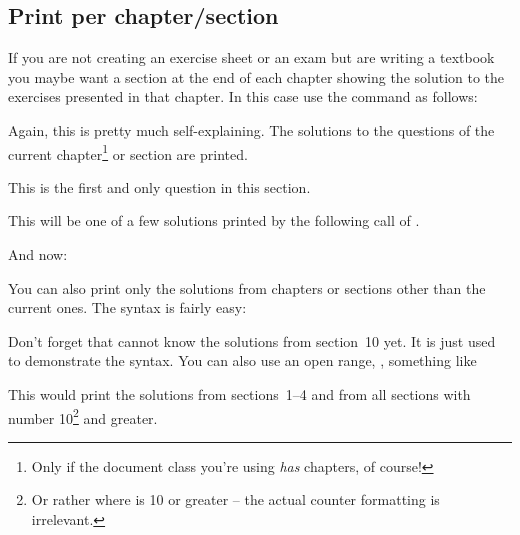 \documentclass[load-preamble+,scrartcl={DIV10}]{cnltx-doc}
\begin{document}
\subsection{Print per chapter/section}
If you are not creating an exercise sheet or an exam but are writing a
textbook you maybe want a section at the end of each chapter showing the
solution to the exercises presented in that chapter.  In this case use the
command as follows:
\begin{sourcecode}
  \printsolutions[section]
  \printsolutions[chapter]
\end{sourcecode}
Again, this is pretty much self-explaining.  The solutions to the questions of
the current chapter\footnote{Only if the document class you're using
  \emph{has} chapters, of course!} or section are printed.
\begin{example}
  \begin{question}
    This is the first and only question in this section.
  \end{question}
  \begin{solution}
    This will be one of a few solutions printed by the following call of
    .
  \end{solution}
  And now:
  \printsolutions[section]
\end{example}

\label{sssec:print_specific_section}
You can also print only the solutions from chapters or sections other than the
current ones.  The syntax is fairly easy:
\begin{example}
  \printsolutions[section={1-7,10}]
\end{example}
Don't forget that  cannot know the solutions from
section~10 yet.  It is just used to demonstrate the syntax. You can also use
an open range, \eg, something like
\begin{sourcecode}
  \printsolutions[section={-4,10-}]
\end{sourcecode}
This would print the solutions from sections~1--4 and from all sections with
number 10\footnote{Or rather where  is 10 or greater --
  the actual counter formatting is irrelevant.} and greater.
\end{document}
